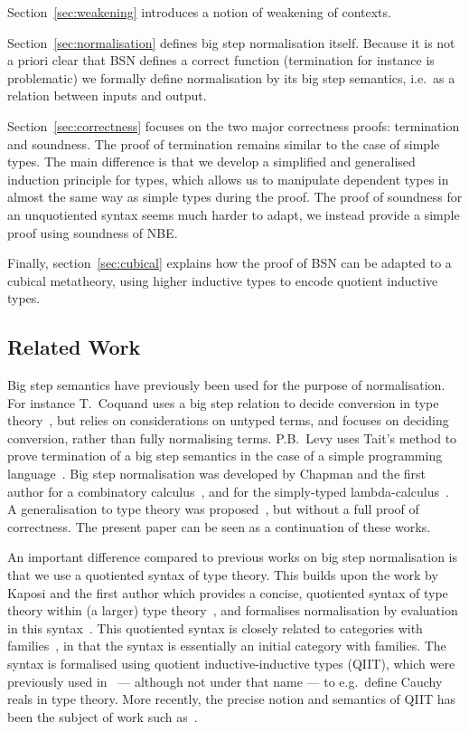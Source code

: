 \documentclass[a4paper,english]{lipics-v2019}
\begin{document}
Section~\ref{sec:weakening} introduces a notion of weakening of contexts.

Section~\ref{sec:normalisation} defines big step normalisation itself. Because
it is not a priori clear that BSN defines a correct function (termination for
instance is problematic) we formally define normalisation by its big step
semantics, i.e.\ as a relation between inputs and output.

Section~\ref{sec:correctness} focuses on the two major correctness proofs:
termination and soundness. The proof of termination remains similar to the case
of simple types. The main difference is that we develop a simplified and
generalised induction principle for types, which allows us to manipulate
dependent types in almost the same way as simple types during the proof.
The proof of soundness for an unquotiented syntax seems much harder to
adapt, we instead provide a simple proof using soundness of NBE.

Finally, section~\ref{sec:cubical} explains how the proof of BSN can be
adapted to a cubical metatheory, using higher inductive types to encode
quotient inductive types.

\subsection{Related Work}
Big step semantics have previously been used for the purpose of normalisation.
For instance T.~Coquand uses a big step relation to decide conversion in type
theory~\cite{coquand1991conversion}, but relies on considerations on untyped
terms, and focuses on deciding conversion, rather than fully normalising terms.
P.B.~Levy uses Tait's method to prove termination of a big step semantics in
the case of a simple programming language~\cite{levy2001call}. Big step
normalisation was developed by Chapman and the first author for a combinatory
calculus~\cite{chapman2006tait}, and for the simply-typed
lambda-calculus~\cite{chapman2009bsn}. A generalisation to type theory was
proposed~\cite{chapman2009type}, but without a full proof of correctness.
The present paper can be seen as a continuation of these works.

An important difference compared to previous works on big step normalisation
is that we use a quotiented syntax of type theory. This builds upon the work by
Kaposi and the first author which provides a concise, quotiented syntax of type
theory within (a larger) type theory~\cite{kaposi2016type}, and formalises
normalisation by evaluation in this syntax~\cite{kaposi2016normalisation}.
This quotiented syntax is closely related to categories with
families~\cite{dybjer1995cwf,hofmann1997syntax}, in that the syntax is
essentially an initial category with families. The syntax is formalised using
quotient inductive-inductive types (QIIT), which were previously used in~\cite{hott}
--- although not under that name --- to e.g.\ define Cauchy reals in type theory.
More recently, the precise notion and semantics of QIIT has been the subject of
work such as~\cite{altenkirch2018quotient,dijkstra2017quotient,kaposi2019quotient}.
\end{document}
